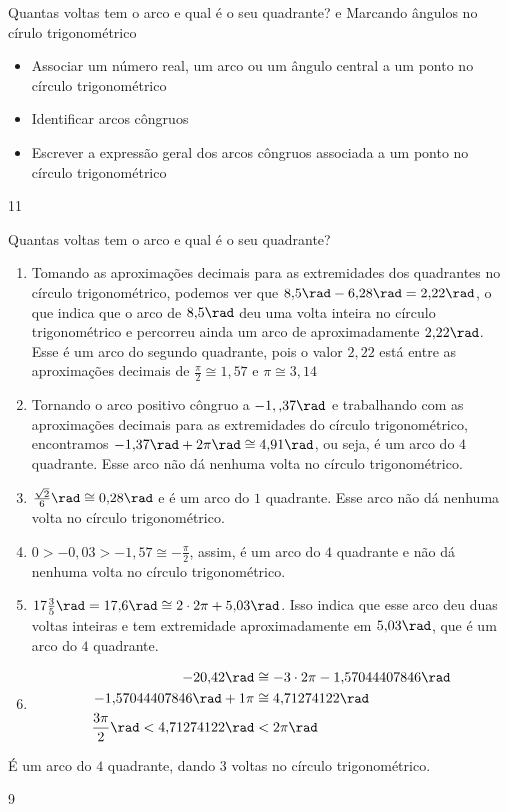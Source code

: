 \begin{objectives}{Quantas voltas tem o arco e qual é o seu quadrante?  e Marcando ângulos no círulo trigonométrico}
{
	\begin{itemize}
	\item Associar um número real, um arco ou um ângulo central a um ponto no círculo trigonométrico
	\item Identificar arcos côngruos
	\item Escrever a expressão geral dos arcos côngruos associada a um ponto no círculo trigonométrico
	\end{itemize}
}
{1}{1}
\end{objectives}
\begin{answer}{Quantas voltas tem o arco e qual é o seu quadrante?}
{
\begin{enumerate}
\item Tomando as aproximações decimais para as extremidades dos quadrantes no círculo trigonométrico, podemos ver que $8{,}5\rad - 6{,}28\rad = 2{,}22\rad$, o que indica que o arco de $8{,}5\rad$ deu uma volta inteira no círculo trigonométrico e percorreu ainda um arco de aproximadamente $2{,}22\rad$. Esse é um arco do segundo quadrante, pois o valor $2{,}22$ está entre as aproximações decimais de $\frac{\pi}{2}\cong1{,}57$ e $\pi\cong3{,}14$
\item Tornando o arco positivo côngruo a $-1,{,}37\rad$ e trabalhando com as aproximações decimais para as extremidades do círculo trigonométrico, encontramos $-1{,}37\rad+2\pi\rad \cong 4{,}91\rad$, ou seja, é um arco do $4$ quadrante. Esse arco não dá nenhuma volta no círculo trigonométrico.
\item $\frac{\sqrt{2}}{6}\rad\cong0{,}28\rad$ e é um arco do $1$ quadrante. Esse arco não dá nenhuma volta no círculo trigonométrico.
\item $0>-0{,}03>-1{,}57\cong-\frac{\pi}{2}$, assim, é um arco do $4$ quadrante e não dá nenhuma volta no círculo trigonométrico.
\item $17\frac{3}{5}\rad=17{,}6\rad\cong2\cdot2\pi+5{,}03\rad$. Isso indica que esse arco deu duas voltas inteiras e tem extremidade aproximadamente em $5{,}03\rad$, que é um arco do $4$ quadrante.
\item 
\begin{align*}
-20{,}42\rad&\cong-3\cdot2\pi-1{,}57044407846\rad \\
-1{,}57044407846\rad+1\pi&\cong4{,}71274122\rad\\
\frac{3\pi}{2}\rad<4{,}71274122\rad&<2\pi\rad
\end{align*}
\end{enumerate}
É um arco do $4$ quadrante, dando $3$ voltas no círculo trigonométrico.
}{9}
\end{answer}
